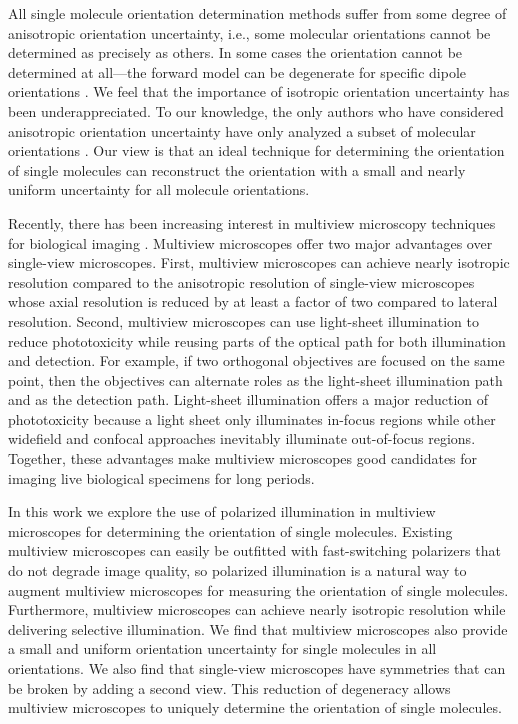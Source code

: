 \documentclass[10pt]{article}
\begin{document}
All single molecule orientation determination methods suffer from some degree of
anisotropic orientation uncertainty, i.e., some molecular orientations cannot be
determined as precisely as others. In some cases the orientation cannot be
determined at all---the forward model can be degenerate for specific dipole
orientations \cite{fourkas2001, lu2008}. We feel that the importance of
isotropic orientation uncertainty has been underappreciated. To our knowledge,
the only authors who have considered anisotropic orientation uncertainty have
only analyzed a subset of molecular orientations \cite{agrawal2012}. Our view is
that an ideal technique for determining the orientation of single molecules can
reconstruct the orientation with a small and nearly uniform uncertainty for all
molecule orientations.

Recently, there has been increasing interest in multiview microscopy techniques
for biological imaging \cite{wu2013, keller2015, wu2016, wu2017}. Multiview
microscopes offer two major advantages over single-view microscopes. First,
multiview microscopes can achieve nearly isotropic resolution compared to the
anisotropic resolution of single-view microscopes whose axial resolution is
reduced by at least a factor of two compared to lateral resolution. Second,
multiview microscopes can use light-sheet illumination to reduce phototoxicity
while reusing parts of the optical path for both illumination and detection. For
example, if two orthogonal objectives are focused on the same point, then the
objectives can alternate roles as the light-sheet illumination path and as the
detection path. Light-sheet illumination offers a major reduction of
phototoxicity because a light sheet only illuminates in-focus regions while
other widefield and confocal approaches inevitably illuminate out-of-focus
regions. Together, these advantages make multiview microscopes good candidates
for imaging live biological specimens for long periods.

In this work we explore the use of polarized illumination in multiview
microscopes for determining the orientation of single molecules. Existing
multiview microscopes can easily be outfitted with fast-switching polarizers
that do not degrade image quality, so polarized illumination is a natural way to
augment multiview microscopes for measuring the orientation of single
molecules. Furthermore, multiview microscopes can achieve nearly isotropic
resolution while delivering selective illumination. We find that multiview
microscopes also provide a small and uniform orientation uncertainty for single
molecules in all orientations. We also find that single-view microscopes have
symmetries that can be broken by adding a second view. This reduction of
degeneracy allows multiview microscopes to uniquely determine the orientation of
single molecules.
\end{document}
